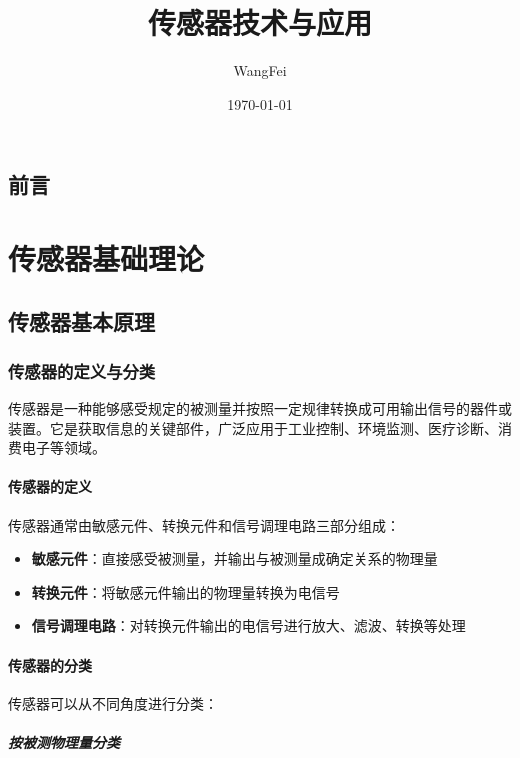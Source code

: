 \documentclass[12pt,UTF8]{ctexbook}
\title{\heiti\zihao{0} 传感器技术与应用}
\author{WangFei}
\date{\today}
\begin{document}
\maketitle
\tableofcontents

\frontmatter
\chapter{前言}

\mainmatter

\part{传感器基础理论}

\chapter{传感器基本原理}

\section{传感器的定义与分类}

传感器是一种能够感受规定的被测量并按照一定规律转换成可用输出信号的器件或装置。它是获取信息的关键部件，广泛应用于工业控制、环境监测、医疗诊断、消费电子等领域。

\subsection{传感器的定义}

传感器通常由敏感元件、转换元件和信号调理电路三部分组成：

\begin{itemize}[leftmargin=2cm]
	\item \textbf{敏感元件}：直接感受被测量，并输出与被测量成确定关系的物理量
	\item \textbf{转换元件}：将敏感元件输出的物理量转换为电信号
	\item \textbf{信号调理电路}：对转换元件输出的电信号进行放大、滤波、转换等处理
\end{itemize}

\subsection{传感器的分类}

传感器可以从不同角度进行分类：

\subsubsection{按被测物理量分类}
\end{document}
